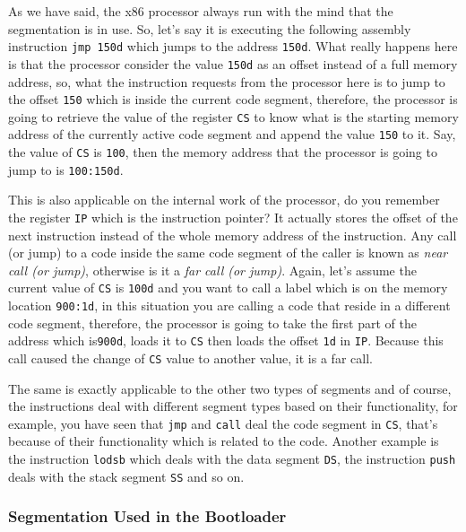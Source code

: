 As we have said, the x86 processor always run with the mind that the
segmentation is in use. So, let's say it is executing the following
assembly instruction \lstinline!jmp 150d! which jumps to the address
\lstinline!150d!. What really happens here is that the processor
consider the value \lstinline!150d! as an offset instead of a full
memory address, so, what the instruction requests from the processor
here is to jump to the offset \lstinline!150! which is inside the
current code segment, therefore, the processor is going to retrieve the
value of the register \lstinline!CS! to know what is the starting memory
address of the currently active code segment and append the value
\lstinline!150! to it. Say, the value of \lstinline!CS! is
\lstinline!100!, then the memory address that the processor is going to
jump to is \lstinline!100:150d!.

This is also applicable on the internal work of the processor, do you
remember the register \lstinline!IP! which is the instruction pointer?
It actually stores the offset of the next instruction instead of the
whole memory address of the instruction. Any call (or jump) to a code
inside the same code segment of the caller is known as \emph{near call
(or jump)}, otherwise is it a \emph{far call (or jump)}. Again, let's
assume the current value of \lstinline!CS! is \lstinline!100d! and you
want to call a label which is on the memory location \lstinline!900:1d!,
in this situation you are calling a code that reside in a different code
segment, therefore, the processor is going to take the first part of the
address which is\lstinline!900d!, loads it to \lstinline!CS! then loads
the offset \lstinline!1d! in \lstinline!IP!. Because this call caused
the change of \lstinline!CS! value to another value, it is a far call.

The same is exactly applicable to the other two types of segments and of
course, the instructions deal with different segment types based on
their functionality, for example, you have seen that \lstinline!jmp! and
\lstinline!call! deal the code segment in \lstinline!CS!, that's because
of their functionality which is related to the code. Another example is
the instruction \lstinline!lodsb! which deals with the data segment
\lstinline!DS!, the instruction \lstinline!push! deals with the stack
segment \lstinline!SS! and so on.

\subsubsection{Segmentation Used in the
Bootloader}\label{segmentation-used-in-the-bootloader}

